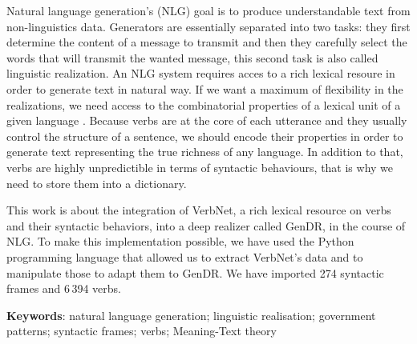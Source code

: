 Natural language generation's (NLG) goal is to produce understandable text from non-linguistics data. Generators are essentially separated into two tasks: they first determine the content of a message to transmit and then they carefully select the words that will transmit the wanted message, this second task is also called linguistic realization. An NLG system requires acces to a rich lexical resoure in order to generate text in natural way. If we want a maximum of flexibility in the realizations, we need access to the combinatorial properties of a lexical unit of a given language . Because verbs are at the core of each utterance and they usually control the structure of a sentence, we should encode their properties in order to generate text representing the true richness of any language. In addition to that, verbs are highly unpredictible in terms of syntactic behaviours, that is why we need to store them into a dictionary.

This work is about the integration of VerbNet, a rich lexical resource on verbs and their syntactic behaviors, into a deep realizer called GenDR, in the course of NLG. To make this implementation possible, we have used the Python programming language that allowed us to extract VerbNet's data and to manipulate those to adapt them to GenDR. We have imported 274 syntactic frames and 6\,394 verbs.

\textbf{Keywords}: natural language generation; linguistic realisation; government patterns; syntactic frames; verbs; Meaning-Text theory